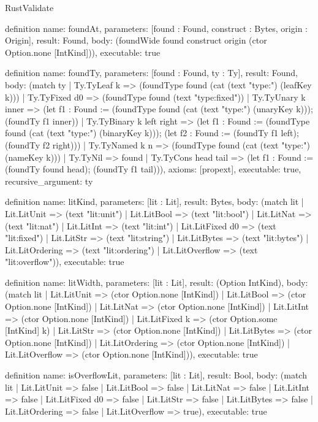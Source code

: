 \begin{lexlean}{RustValidate}
\begin{semanticmodule}
definition{
  name: foundAt,
  parameters: [found : Found, construct : Bytes, origin : Origin],
  result: Found,
  body: (foundWide found construct origin (ctor Option.none [IntKind])),
  executable: true
}

definition{
  name: foundTy,
  parameters: [found : Found, ty : Ty],
  result: Found,
  body: (match ty
    | Ty.TyLeaf k => (foundType found (cat (text "type:") (leafKey k)))
    | Ty.TyFixed d0 => (foundType found (text "type:fixed"))
    | Ty.TyUnary k inner => (let f1 : Found := (foundType found (cat (text "type:") (unaryKey k))); (foundTy f1 inner))
    | Ty.TyBinary k left right => (let f1 : Found := (foundType found (cat (text "type:") (binaryKey k))); (let f2 : Found := (foundTy f1 left); (foundTy f2 right)))
    | Ty.TyNamed k n => (foundType found (cat (text "type:") (nameKey k)))
    | Ty.TyNil => found
    | Ty.TyCons head tail => (let f1 : Found := (foundTy found head); (foundTy f1 tail))),
  axioms: [propext],
  executable: true,
  recursive_argument: ty
}

definition{
  name: litKind,
  parameters: [lit : Lit],
  result: Bytes,
  body: (match lit
    | Lit.LitUnit => (text "lit:unit")
    | Lit.LitBool => (text "lit:bool")
    | Lit.LitNat => (text "lit:nat")
    | Lit.LitInt => (text "lit:int")
    | Lit.LitFixed d0 => (text "lit:fixed")
    | Lit.LitStr => (text "lit:string")
    | Lit.LitBytes => (text "lit:bytes")
    | Lit.LitOrdering => (text "lit:ordering")
    | Lit.LitOverflow => (text "lit:overflow")),
  executable: true
}

definition{
  name: litWidth,
  parameters: [lit : Lit],
  result: (Option IntKind),
  body: (match lit
    | Lit.LitUnit => (ctor Option.none [IntKind])
    | Lit.LitBool => (ctor Option.none [IntKind])
    | Lit.LitNat => (ctor Option.none [IntKind])
    | Lit.LitInt => (ctor Option.none [IntKind])
    | Lit.LitFixed k => (ctor Option.some [IntKind] k)
    | Lit.LitStr => (ctor Option.none [IntKind])
    | Lit.LitBytes => (ctor Option.none [IntKind])
    | Lit.LitOrdering => (ctor Option.none [IntKind])
    | Lit.LitOverflow => (ctor Option.none [IntKind])),
  executable: true
}

definition{
  name: isOverflowLit,
  parameters: [lit : Lit],
  result: Bool,
  body: (match lit
    | Lit.LitUnit => false
    | Lit.LitBool => false
    | Lit.LitNat => false
    | Lit.LitInt => false
    | Lit.LitFixed d0 => false
    | Lit.LitStr => false
    | Lit.LitBytes => false
    | Lit.LitOrdering => false
    | Lit.LitOverflow => true),
  executable: true
}


\end{semanticmodule}
\end{lexlean}

